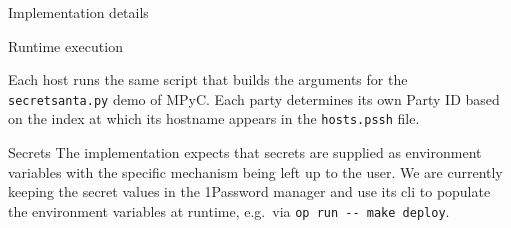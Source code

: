 \begin{frame}[fragile]{Implementation details}
\begin{block}{Runtime execution}
\begin{Shaded}
\begin{Highlighting}[]
\OperatorTok{=}
 \OperatorTok{=}   
     \BuiltInTok{[}    \BuiltInTok{]}
     \BuiltInTok{[}   \BuiltInTok{]}

    \OperatorTok{=}\OperatorTok{\#}\VariableTok{\}}

     \BuiltInTok{[}  \OtherTok{=}  \BuiltInTok{]}
        \OperatorTok{=}
    \KeywordTok{((} \OperatorTok{=}  \OperatorTok{+} \KeywordTok{))}

    \OperatorTok{+=}\StringTok{:} 
 \OperatorTok{\textless{}} 

 \BuiltInTok{[}  \OtherTok{=}\BuiltInTok{]}

\OperatorTok{=}\DataTypeTok{\textbackslash{}}
\StringTok{ }\DataTypeTok{\textbackslash{}}
\StringTok{    }

 

\end{Highlighting}
\end{Shaded}

Each host runs the same script that builds the arguments for the
\texttt{secretsanta.py} demo of MPyC. Each party determines its own
Party ID based on the index at which its hostname appears in the
\texttt{hosts.pssh} file.
\end{block}

\begin{block}{Secrets}
\protect\hypertarget{secrets}{}
The implementation expects that secrets are supplied as environment
variables with the specific mechanism being left up to the user. We are
currently keeping the secret values in the 1Password manager and use its
\gls{cli} to populate the environment variables at runtime, e.g.~via
\texttt{op\ run\ -\/-\ make\ deploy}.
\end{block}
\end{frame}

